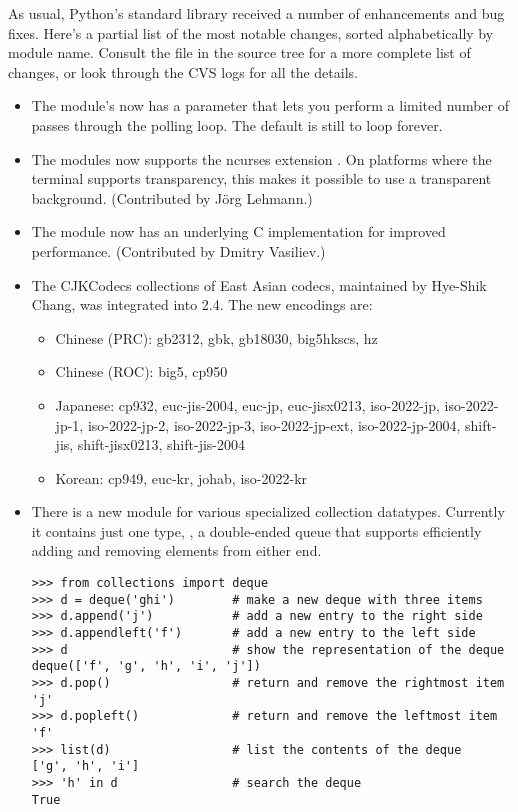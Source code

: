 \documentclass{howto}
\begin{document}
As usual, Python's standard library received a number of enhancements and
bug fixes.  Here's a partial list of the most notable changes, sorted
alphabetically by module name. Consult the
 file in the source tree for a more
complete list of changes, or look through the CVS logs for all the
details.

\begin{itemize}


\item The  module's  now has a 
    parameter that lets you perform a limited number 
   of passes through the polling loop.  The default is still to loop
   forever.

\item The  modules now supports the ncurses extension 
   .  On platforms where the terminal
   supports transparency, this makes it possible to use a transparent
   background.  (Contributed by J\"org Lehmann.)

\item The  module now has an underlying C implementation
   for improved performance.
   (Contributed by Dmitry Vasiliev.)

\item The CJKCodecs collections of East Asian codecs, maintained
by Hye-Shik Chang, was integrated into 2.4.  
The new encodings are:

\begin{itemize}
 \item Chinese (PRC): gb2312, gbk, gb18030, big5hkscs, hz
 \item Chinese (ROC): big5, cp950
 \item Japanese: cp932, euc-jis-2004, euc-jp,
euc-jisx0213, iso-2022-jp, iso-2022-jp-1, iso-2022-jp-2,
 iso-2022-jp-3, iso-2022-jp-ext, iso-2022-jp-2004,
 shift-jis, shift-jisx0213, shift-jis-2004
 \item Korean: cp949, euc-kr, johab, iso-2022-kr
\end{itemize} 

\item There is a new  module for 
   various specialized collection datatypes.  
   Currently it contains just one type, , 
   a double-ended queue that supports efficiently adding and removing
   elements from either end.

\begin{verbatim}
>>> from collections import deque
>>> d = deque('ghi')        # make a new deque with three items
>>> d.append('j')           # add a new entry to the right side
>>> d.appendleft('f')       # add a new entry to the left side
>>> d                       # show the representation of the deque
deque(['f', 'g', 'h', 'i', 'j'])
>>> d.pop()                 # return and remove the rightmost item
'j'
>>> d.popleft()             # return and remove the leftmost item
'f'
>>> list(d)                 # list the contents of the deque
['g', 'h', 'i']
>>> 'h' in d                # search the deque
True  
\end{verbatim}


\end{itemize}
\end{document}
